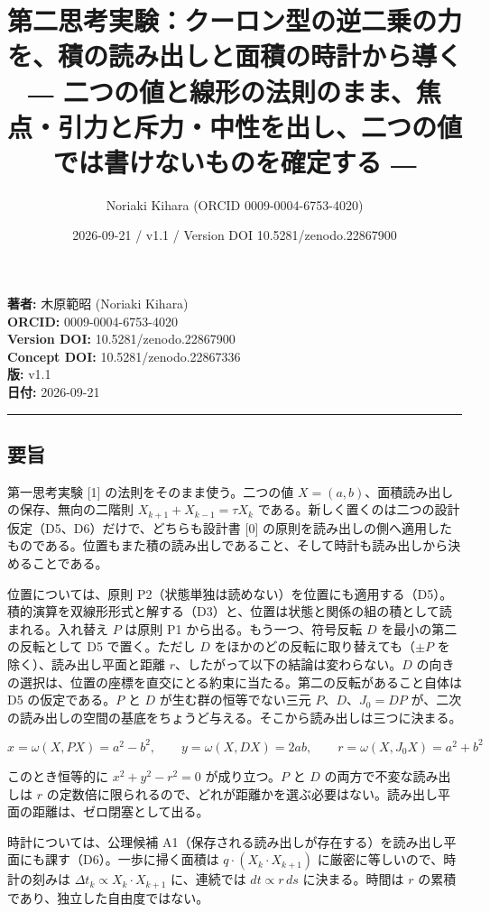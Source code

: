 \documentclass[
  a4paper,
]{ltjsarticle}
\title{第二思考実験：クーロン型の逆二乗の力を、積の読み出しと面積の時計から導く
―
二つの値と線形の法則のまま、焦点・引力と斥力・中性を出し、二つの値では書けないものを確定する
―}
\author{Noriaki Kihara (ORCID 0009-0004-6753-4020)}
\date{2026-09-21 / v1.1 / Version DOI 10.5281/zenodo.22867900}
\begin{document}
\maketitle

\textbf{著者:} 木原範昭 (Noriaki Kihara)\\
\textbf{ORCID:} 0009-0004-6753-4020\\
\textbf{Version DOI:} 10.5281/zenodo.22867900\\
\textbf{Concept DOI:} 10.5281/zenodo.22867336\\
\textbf{版:} v1.1\\
\textbf{日付:} 2026-09-21

\begin{center}\rule{0.5\linewidth}{0.5pt}\end{center}

\subsection{要旨}\label{ux8981ux65e8}

第一思考実験 {[}1{]} の法則をそのまま使う。二つの値
\(X=(a,b)\)、面積読み出しの保存、無向の二階則
\(X_{k+1}+X_{k-1}=\tau X_k\)
である。新しく置くのは二つの設計仮定（D5、D6）だけで、どちらも設計書
{[}0{]}
の原則を読み出しの側へ適用したものである。位置もまた積の読み出しであること、そして時計も読み出しから決めることである。

位置については、原則
P2（状態単独は読めない）を位置にも適用する（D5）。積的演算を双線形形式と解する（D3）と、位置は状態と関係の組の積として読まれる。入れ替え
\(P\) は原則 P1 から出る。もう一つ、符号反転 \(D\)
を最小の第二の反転として D5 で置く。ただし \(D\)
をほかのどの反転に取り替えても（\(\pm P\) を除く）、読み出し平面と距離
\(r\)、したがって以下の結論は変わらない。\(D\)
の向きの選択は、位置の座標を直交にとる約束に当たる。第二の反転があること自体は
D5 の仮定である。\(P\) と \(D\) が生む群の恒等でない三元
\(P\)、\(D\)、\(J_0=DP\)
が、二次の読み出しの空間の基底をちょうど与える。そこから読み出しは三つに決まる。

\[
x=\omega(X,PX)=a^2-b^2,\qquad y=\omega(X,DX)=2ab,\qquad r=\omega(X,J_0X)=a^2+b^2
\]

このとき恒等的に \(x^2+y^2-r^2=0\) が成り立つ。\(P\) と \(D\)
の両方で不変な読み出しは \(r\)
の定数倍に限られるので、どれが距離かを選ぶ必要はない。読み出し平面の距離は、ゼロ閉塞として出る。

時計については、公理候補
A1（保存される読み出しが存在する）を読み出し平面にも課す（D6）。一歩に掃く面積は
\(q\cdot(X_k\cdot X_{k+1})\) に厳密に等しいので、時計の刻みは
\(\Delta t_k\propto X_k\cdot X_{k+1}\) に、連続では \(dt\propto r\,ds\)
に決まる。時間は \(r\) の累積であり、独立した自由度ではない。
\end{document}
